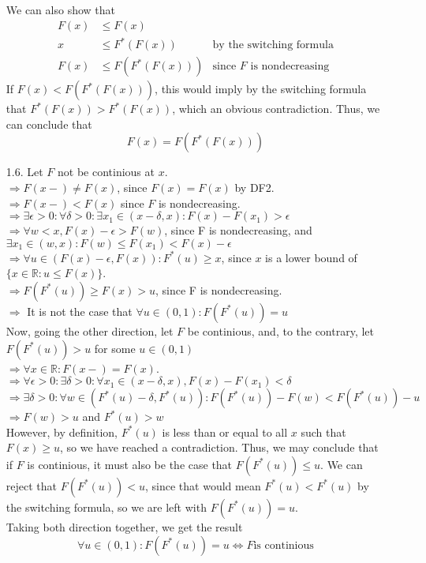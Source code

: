 \documentclass[11pt]{article}
\newcommand{\R}{\mathbb{R}}
\theoremstyle{definition}
\begin{document}
\begin{itemize}
        We can also show that
        \begin{align*}
            F(x) &\leq     F(x)     & \\
              x  &\leq F^*(F(x))    & \mbox{by the switching formula} \\
            F(x) &\leq F(F^*(F(x))) & \mbox{since } F \mbox{ is nondecreasing}
        \end{align*}    
        If \(F(x) < F(F^*(F(x)))\), this would imply by the switching formula that \(F^*(F(x))>F^*(F(x))\), which an obvious contradiction. Thus, we can conclude that
        \[F(x) = F(F^*(F(x)))\]
    \item[1.6.]
        Let $F$ not be continious at $x$.  \\
        \(\Rightarrow F(x-)\neq F(x)\), since \(F(x)=F(x)\) by DF2. \\
        \(\Rightarrow F(x-)< F(x)\) since $F$ is nondecreasing. \\
        \(\Rightarrow \exists \epsilon>0: \forall \delta>0: \exists x_1\in(x-\delta,x): F(x)-F(x_1)>\epsilon \) \\
        \(\Rightarrow \forall w<x, F(x)-\epsilon>F(w)\), since F is nondecreasing, and \(\exists x_1\in(w,x): F(w)\leq F(x_1)< F(x)-\epsilon\) \\
        \(\Rightarrow \forall u \in (F(x)-\epsilon,F(x)): F^*(u)\geq x \), since $x$ is a lower bound of \(\{x\in\R:u\leq F(x)\}\). \\
        \(\Rightarrow F(F^*(u)) \geq F(x) > u \), since F is nondecreasing. \\
        \(\Rightarrow\) It is not the case that \(\forall u \in(0,1): F(F^*(u))=u \)  \\
        Now, going the other direction, let $F$ be continious, and, to the contrary, let \(F(F^*(u))>u\) for some \(u\in(0,1)\) \\
        \(\Rightarrow \forall x\in\R: F(x-)= F(x) \). \\
        \(\Rightarrow \forall \epsilon>0: \exists \delta>0: \forall x_1\in (x-\delta,x), F(x)-F(x_1)<\delta \) \\
        \(\Rightarrow \exists \delta>0: \forall w \in (F^*(u)-\delta,F^*(u)): F(F^*(u))-F(w)<F(F^*(u))-u \) \\
        \(\Rightarrow F(w)>u \) and \(F^*(u)>w\) \\
        However, by definition, \(F^*(u)\) is less than or equal to all $x$ such that \(F(x)\geq u\), so we have reached a contradiction. Thus, we may conclude that if $F$ is continious,
        it must also be the case that \(F(F^*(u))\leq u \). We can reject that \(F(F^*(u))< u \), since that would mean \(F^*(u)<F^*(u) \) by the switching formula, so we are left with \(F(F^*(u))= u \). \\
        Taking both direction together, we get the result 
        \[\forall u\in(0,1): F(F^*(u))=u \Leftrightarrow F \mbox{is continious} \]
        \smallskip


\end{itemize}
\end{document}
